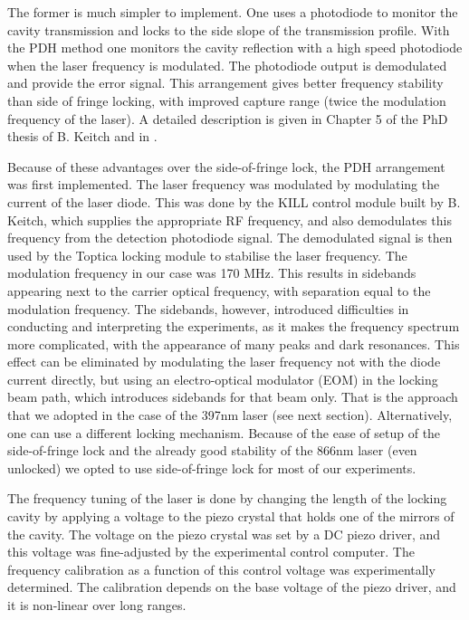 The former is much simpler to implement. One uses a photodiode to monitor the cavity transmission and locks to the side slope of the transmission profile. With the PDH method one monitors the cavity reflection with a high speed photodiode when the laser frequency is modulated. The photodiode output is demodulated and provide the error signal. This arrangement gives better frequency stability than side of fringe locking, with improved capture range (twice the modulation frequency of the laser). A detailed description is given  in Chapter 5 of the PhD thesis of B. Keitch \cite{Keitch2007} and in \cite{Drever1983}. 


Because of these advantages over the side-of-fringe lock, the PDH arrangement was first implemented. The laser frequency was modulated by modulating the current of the laser diode. This was done by the KILL control module built by B. Keitch, which supplies the appropriate RF frequency, and also demodulates this frequency from the detection photodiode signal. The demodulated signal is then used by the Toptica locking module to stabilise the laser frequency. The modulation frequency in our case was 170 MHz. This results in sidebands appearing next to the carrier optical frequency, with separation equal to the modulation frequency. The sidebands, however, introduced difficulties in conducting and interpreting the experiments, as it makes the frequency spectrum more complicated, with the appearance of many peaks and dark resonances. This effect can be eliminated by modulating the laser frequency not with the diode current directly, but using an electro-optical modulator (EOM) in the locking beam path, which introduces sidebands for that beam only. That is the approach that we adopted in the case of the 397nm laser (see next section). Alternatively, one can use a different locking mechanism. Because of the ease of setup of the side-of-fringe lock and the already good stability of the 866nm laser (even unlocked) we opted to use side-of-fringe lock for most of our experiments.

The frequency tuning of the laser is done by changing the length of the locking cavity by applying a voltage to the piezo crystal that holds one of the mirrors of the cavity. The voltage on the piezo crystal was set by a DC piezo driver, and this voltage was fine-adjusted by the experimental control computer. The frequency calibration as a function of this control voltage was experimentally determined. The calibration depends on the base voltage of the piezo driver, and it is non-linear over long ranges. 

